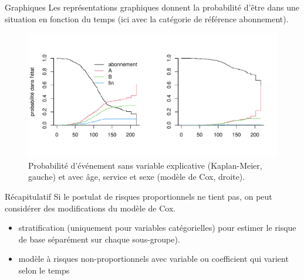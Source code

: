 \documentclass[
  ignorenonframetext,
]{beamer}
\providecommand{\tightlist}{%
  \setlength{\itemsep}{0pt}\setlength{\parskip}{0pt}}\usepackage{longtable,booktabs,array}
\begin{document}
\begin{frame}{Graphiques}
\protect\hypertarget{graphiques}{}
Les représentations graphiques donnent la probabilité d'être dans une
situation en fonction du temps (ici avec la catégorie de référence
abonnement).

\footnotesize

\begin{figure}

{\centering \includegraphics[width=1\textwidth,height=\textheight]{MATH60602-diapos9_files/figure-beamer/fig-competitif-1.pdf}

}

\caption{\label{fig-competitif}Probabilité d'événement sans variable
explicative (Kaplan-Meier, gauche) et avec âge, service et sexe (modèle
de Cox, droite).}

\end{figure}
\end{frame}

\begin{frame}{Récapitulatif}
\protect\hypertarget{ruxe9capitulatif}{}
Si le postulat de risques proportionnels ne tient pas, on peut
considérer des modifications du modèle de Cox.

\begin{itemize}
\tightlist
\item
  stratification (uniquement pour variables catégorielles) pour estimer
  le risque de base séparément sur chaque sous-groupe).
\item
  modèle à risques non-proportionnels avec variable ou coefficient qui
  varient selon le temps
\end{itemize}
\end{frame}
\end{document}
